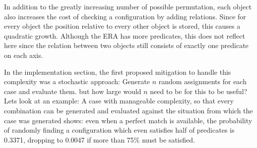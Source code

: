 In addition to the greatly increasing number of possible permutation, each object also increases the cost of checking a configuration by adding relations.
Since for every object the position relative to every other object is stored, this causes a quadratic growth. Although the ERA has more predicates, this does not reflect here since the relation between two objects still consists of exactly one predicate on each axis.

In the implementation section, the first proposed mitigation to handle this complexity was a stochastic approach: Generate $n$ random assignments for each case and evaluate them. but how large would $n$ need to be for this to be useful?
Lets look at an example: A case with manageable complexity, so that every combination can be generated and evaluated against the situation from which the case was generated shows: even when a perfect match is available, the probability of randomly finding a configuration which even satisfies half of predicates is 0.3371, dropping to 0.0047 if more than 75\% must be satisfied.



